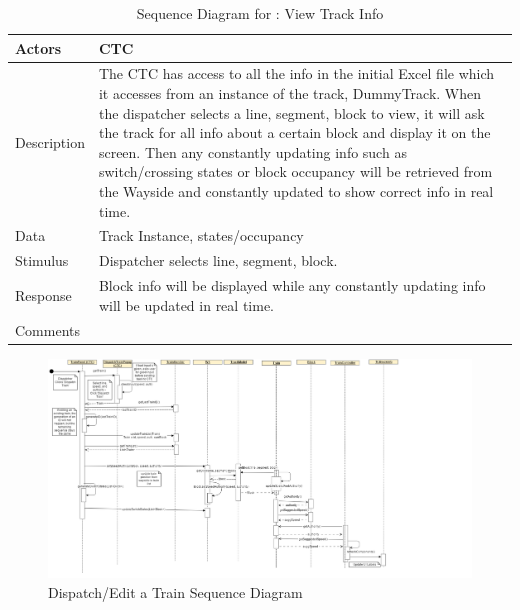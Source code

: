 \documentclass[]{article}
\begin{document}
\begin{table}[H]
	\centering
	\caption{Sequence Diagram for : View Track Info}
	\begin{tabular}{|l|l|}
		\hline
		Actors & \parbox[t]{10cm}{CTC} \\ \hline
		Description & \parbox[t]{10cm}{The CTC has access to all the info in the initial Excel file which it accesses from an instance of the track, DummyTrack. When the dispatcher selects a line, segment, block to view, it will ask the track for all info about a certain block and display it on the screen. Then any constantly updating info such as switch/crossing states or block occupancy will be retrieved from the Wayside and constantly updated to show correct info in real time. } \\ \hline
		Data &  \parbox[t]{10cm}{Track Instance, states/occupancy} \\ \hline
		Stimulus &  \parbox[t]{10cm}{Dispatcher selects line, segment, block.} \\ \hline
		Response & \parbox[t]{10cm}{Block info will be displayed while any constantly updating info will be updated in real time.}\\ \hline
		Comments & \parbox[t]{10cm}{}  \\ \hline
	\end{tabular}
\end{table}

\begin{figure}[H]
	\centering
	\includegraphics[width=\textwidth]{CTCdispatchTrain.png}
	\caption{Dispatch/Edit a Train Sequence Diagram}
\end{figure}
\end{document}
